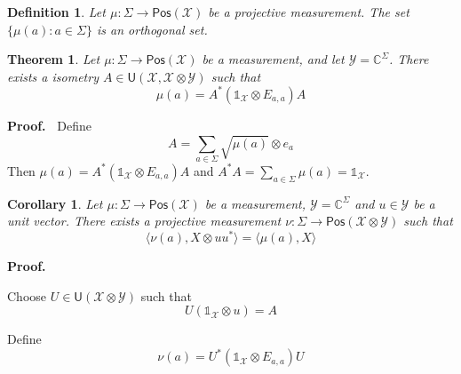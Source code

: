 \documentclass[aps,pra,onecolumn,notitlepage,superscriptaddress]{revtex4-1}
\newcommand{\C}{\mathbb{C}}
\newcommand{\spc}[1]{\mathcal{#1}}
\newcommand{\Pos}{\mathsf{Pos}}
\newcommand{\U}{\mathsf{U}}
\def\>{\rangle}
\def\<{\langle}
\newcommand\I{\mathds{1}}
\newtheorem{theo}{Theorem}
\newtheorem{cor}{Corollary}
\newtheorem{defi}{Definition}
\def\Proof{{\bf Proof.~}}
\begin{document}
    \begin{defi}
        Let $\mu : \Sigma \to \Pos(\spc X)$ be a projective measurement. The set $\{\mu(a) : a \in \Sigma\}$ is an orthogonal set.
    \end{defi}

    \begin{theo}
        Let $\mu : \Sigma \to \Pos(\spc X)$ be a measurement, and let $\spc Y = \C^{\Sigma}$. There exists a isometry $A \in \U(\spc X, \spc X \otimes \spc Y)$ such that
        \begin{equation}
            \mu(a) = A^* (\I_{\spc X} \otimes E_{a,a})A
        \end{equation}
    \end{theo}
    \Proof {
        Define
        \begin{equation}
            A = \sum_{a \in \Sigma} \sqrt{\mu(a)} \otimes e_a
        \end{equation}
        Then $\mu(a) = A^* (\I_{\spc X} \otimes E_{a,a})A$ and $A^*A = \sum_{a \in \Sigma} \mu(a) = \I_{\spc X}$.
    }

    \begin{cor}
        Let $\mu : \Sigma \to \Pos(\spc X)$ be a measurement, $\spc Y = \C^{\Sigma}$ and $u \in \spc Y$ be a unit vector. There exists a projective measurement $\nu : \Sigma \to \Pos(\spc X \otimes \spc Y)$ such that
        \begin{equation}
            \< \nu(a), X \otimes uu^* \> = \< \mu(a), X \>
        \end{equation}
    \end{cor}
    \Proof {
        Choose $U \in \U(\spc X \otimes \spc Y)$ such that
        \begin{equation}
            U(\I_{\spc X} \otimes u) = A
        \end{equation}

        Define
        \begin{equation}
            \nu(a) = U^*(\I_{\spc X} \otimes E_{a,a})U
        \end{equation}
    }
\end{document}
